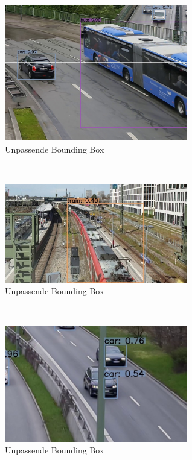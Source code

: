 \documentclass[conference]{IEEEtran}
\begin{document}
	\begin{figure}[!h]
		\begin{center}
			\includegraphics[width=8cm]{Media/Output_777 - Kopie.jpg}
			\caption{Unpassende Bounding Box}
			\label{UB}
		\end{center}
	\end{figure}\\
	\begin{figure}[!h]
		\begin{center}
			\includegraphics[width=8cm]{Media/Output_2126.jpg}
			\caption{Unpassende Bounding Box}
			\label{UB4}
		\end{center}
	\end{figure}\\
	\begin{figure}[!h]
		\begin{center}
			\includegraphics[width=8cm]{Media/Output_276 - Kopie.jpg}
			\caption{Unpassende Bounding Box}
			\label{UB2}
		\end{center}
	\end{figure}\\
\end{document}
